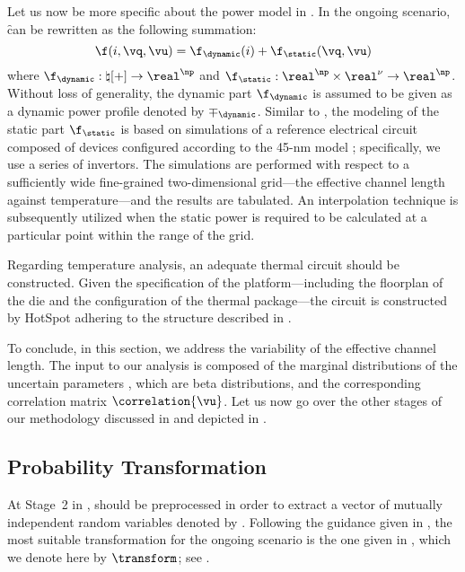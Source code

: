 Let us now be more specific about the power model in .
In the ongoing scenario, \f can be rewritten as the following summation:
\[
  \f(i, \vq, \vu) = \f_\dynamic(i) + \f_\static(\vq, \vu)
\]
where $\f_\dynamic: \natural[+] \to \real^\np$ and $\f_\static: \real^\np \times
\real^\nu \to \real^\np$. Without loss of generality, the dynamic part
$\f_\dynamic$ is assumed to be given as a dynamic power profile denoted by
$\mp_\dynamic$. Similar to , the modeling of the static
part $\f_\static$ is based on  simulations of a reference electrical
circuit composed of  devices \cite{bsim} configured according to the
45-nm   model \cite{ptm}; specifically, we use a series of
 invertors. The simulations are performed with respect to a
sufficiently wide fine-grained two-dimensional grid---the effective channel
length against temperature---and the results are tabulated. An interpolation
technique is subsequently utilized when the static power is required to be
calculated at a particular point within the range of the grid.

Regarding temperature analysis, an adequate thermal  circuit should be
constructed. Given the specification of the platform---including the floorplan
of the die and the configuration of the thermal package---the circuit is
constructed by HotSpot \cite{skadron2003} adhering to the structure described in
.

To conclude, in this section, we address the variability of the effective
channel length. The input to our analysis is composed of the marginal
distributions of the uncertain parameters \vu, which are beta distributions, and
the corresponding correlation matrix $\correlation{\vu}$. Let us now go over the
other stages of our methodology discussed in 
and depicted in .

\subsection{Probability Transformation}

At Stage~2 in , \vu should be preprocessed in order to
extract a vector of mutually independent random variables denoted by \vz.
Following the guidance given in , the most suitable
transformation for the ongoing scenario is the one given in
, which we denote here by $\transform$; see
.

